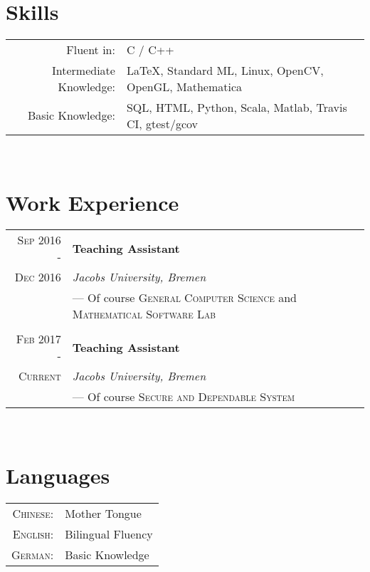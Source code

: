 \documentclass[a4paper,10pt]{article}
\begin{document}
	~\\
	
	\section{Skills}
	\begin{tabular}{rl}
		Fluent in: & C / C++\\
		Intermediate Knowledge:& LaTeX, Standard ML, Linux, OpenCV, OpenGL, Mathematica\\
		Basic Knowledge:& SQL, HTML, Python, Scala, Matlab, Travis CI, gtest/gcov \\
	\end{tabular}
	
	
	~\\
	
	\section{Work Experience}
	\begin{tabular}{r|l}
		\textsc{Sep 2016 - } & \textbf{Teaching Assistant} \\\textsc{Dec 2016}&\emph{Jacobs University, Bremen}
		\\& --- Of course \textsc{General Computer Science} and \textsc{Mathematical Software Lab} 
		\\ \multicolumn{2}{c}{} \\
		\textsc{Feb 2017 - } & \textbf{Teaching Assistant} \\\textsc{Current}&\emph{Jacobs University, Bremen}
		\\& --- Of course \textsc{Secure and Dependable System}
	\end{tabular}
	
	~\\
	
	\section{Languages}
	\begin{tabular}{rl}
		\textsc{Chinese:}& Mother Tongue\\
		\textsc{English:}& Bilingual Fluency\\
		\textsc{German:}& Basic Knowledge\\
	\end{tabular}
	
\end{document}
